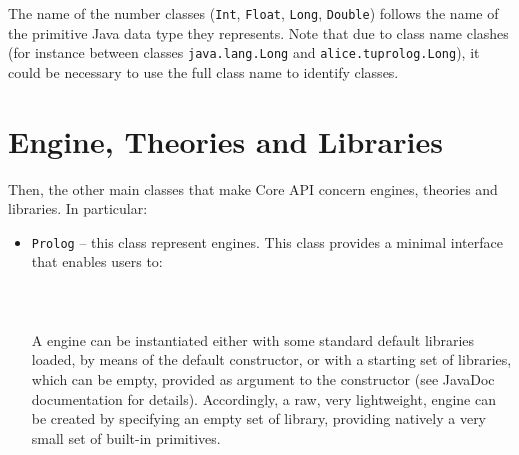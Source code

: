 %
\noindent The name of the \tuprolog{} number classes
(\texttt{Int}, \texttt{Float}, \texttt{Long}, \texttt{Double})
follows the name of the primitive Java data type they represents.
%
Note that due to class name clashes (for instance between classes
\texttt{java.lang.Long} and \texttt{alice.tuprolog.Long}), it
could be necessary to use the full class name to identify
\tuprolog{} classes.
%

\section{Engine, Theories and Libraries}

\noindent Then, the other main classes that make \tuprolog{} Core
API concern \tuprolog{} engines, theories and libraries. In
particular:
%
\begin{itemize}
    \item \texttt{Prolog} -- this class represent \tuprolog{}
    engines.
    This class provides a minimal interface that enables users
    to: \\
    \\
     \\
    \\
    A \tuprolog{} engine can be instantiated either with some standard default
    libraries loaded, by means of the default constructor, or with
    a starting set of libraries, which can be empty, provided as
    argument to the constructor (see JavaDoc documentation for
    details).
    Accordingly, a raw, very lightweight, \tuprolog{} engine can
    be created by specifying an empty set of library, providing
    natively a very small set of built-in primitives.



\end{itemize}
